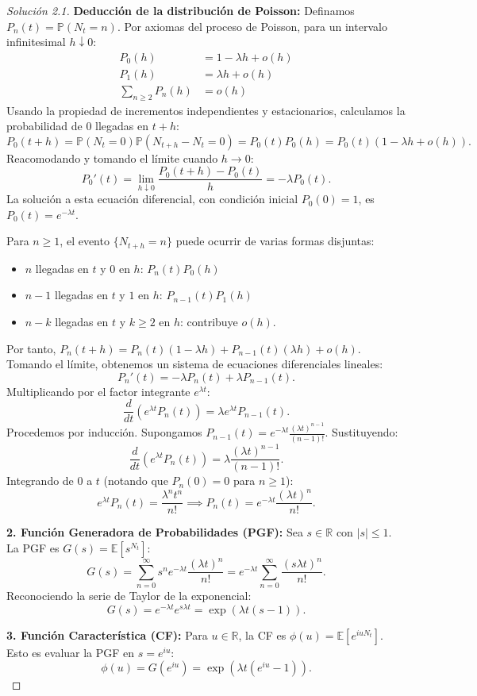 \documentclass[10pt,a4paper]{article}
\begin{document}
\begin{proof}[Solución 2.1]
    \textbf{Deducción de la distribución de Poisson:}
    Definamos $P_n(t) = \mathbb{P}(N_t = n)$. Por axiomas del proceso de Poisson, para un intervalo infinitesimal $h \downarrow 0$:
    \begin{align*}
        P_0(h) &= 1 - \lambda h + o(h) \\
        P_1(h) &= \lambda h + o(h) \\
        \sum_{n \ge 2} P_n(h) &= o(h)
    \end{align*}
    Usando la propiedad de incrementos independientes y estacionarios, calculamos la probabilidad de $0$ llegadas en $t+h$:
    \[ P_0(t+h) = \mathbb{P}(N_t=0)\mathbb{P}(N_{t+h}-N_t=0) = P_0(t)P_0(h) = P_0(t)(1 - \lambda h + o(h)). \]
    Reacomodando y tomando el límite cuando $h \to 0$:
    \[ P_0'(t) = \lim_{h \downarrow 0} \frac{P_0(t+h) - P_0(t)}{h} = -\lambda P_0(t). \]
    La solución a esta ecuación diferencial, con condición inicial $P_0(0) = 1$, es $P_0(t) = e^{-\lambda t}$.

    Para $n \ge 1$, el evento $\{N_{t+h} = n\}$ puede ocurrir de varias formas disjuntas:
    \begin{itemize}
        \item $n$ llegadas en $t$ y $0$ en $h$: $P_n(t)P_0(h)$
        \item $n-1$ llegadas en $t$ y $1$ en $h$: $P_{n-1}(t)P_1(h)$
        \item $n-k$ llegadas en $t$ y $k \ge 2$ en $h$: contribuye $o(h)$.
    \end{itemize}
    Por tanto, $P_n(t+h) = P_n(t)(1-\lambda h) + P_{n-1}(t)(\lambda h) + o(h)$.
    Tomando el límite, obtenemos un sistema de ecuaciones diferenciales lineales:
    \[ P_n'(t) = -\lambda P_n(t) + \lambda P_{n-1}(t). \]
    Multiplicando por el factor integrante $e^{\lambda t}$:
    \[ \frac{d}{dt} \left( e^{\lambda t} P_n(t) \right) = \lambda e^{\lambda t} P_{n-1}(t). \]
    Procedemos por inducción. Supongamos $P_{n-1}(t) = e^{-\lambda t} \frac{(\lambda t)^{n-1}}{(n-1)!}$. Sustituyendo:
    \[ \frac{d}{dt} \left( e^{\lambda t} P_n(t) \right) = \lambda \frac{(\lambda t)^{n-1}}{(n-1)!}. \]
    Integrando de $0$ a $t$ (notando que $P_n(0) = 0$ para $n \ge 1$):
    \[ e^{\lambda t} P_n(t) = \frac{\lambda^n t^n}{n!} \implies P_n(t) = e^{-\lambda t}\frac{(\lambda t)^n}{n!}. \]

    \textbf{2. Función Generadora de Probabilidades (PGF):}
    Sea $s \in \mathbb{R}$ con $|s| \le 1$. La PGF es $G(s) = \mathbb{E}[s^{N_t}]$:
    \[ G(s) = \sum_{n=0}^\infty s^n e^{-\lambda t} \frac{(\lambda t)^n}{n!} = e^{-\lambda t} \sum_{n=0}^\infty \frac{(s\lambda t)^n}{n!}. \]
    Reconociendo la serie de Taylor de la exponencial:
    \[ G(s) = e^{-\lambda t} e^{s\lambda t} = \exp\left(\lambda t (s-1)\right). \]

    \textbf{3. Función Característica (CF):}
    Para $u \in \mathbb{R}$, la CF es $\phi(u) = \mathbb{E}[e^{iuN_t}]$. Esto es evaluar la PGF en $s = e^{iu}$:
    \[ \phi(u) = G(e^{iu}) = \exp\left(\lambda t (e^{iu}-1)\right). \]
\end{proof}
\end{document}
